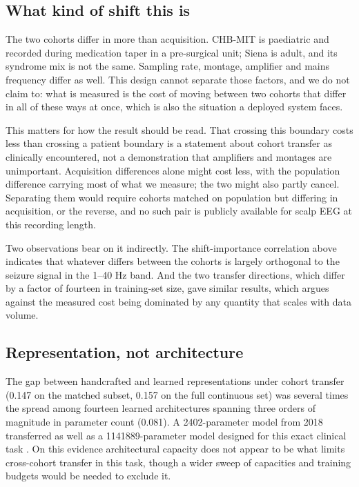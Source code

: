 \documentclass[11pt,a4paper]{article}
\begin{document}
\subsection{What kind of shift this is}\label{sec:whatshift}

The two cohorts differ in more than acquisition. CHB-MIT is paediatric and
recorded during medication taper in a pre-surgical unit; Siena is adult, and
its syndrome mix is not the same. Sampling rate, montage, amplifier and mains
frequency differ as well. This design cannot separate those factors, and we
do not claim to: what is measured is the cost of moving between two cohorts
that differ in all of these ways at once, which is also the situation a
deployed system faces.

This matters for how the result should be read. That crossing this boundary costs
less than crossing a patient boundary is a statement about cohort transfer
as clinically encountered, not a demonstration that amplifiers and montages
are unimportant. Acquisition differences alone might
cost less, with the population difference carrying most of what we measure;
the two might also partly cancel. Separating them would require cohorts
matched on population but differing in acquisition, or the reverse, and no
such pair is publicly available for scalp EEG at this recording length.

Two observations bear on it indirectly. The shift-importance correlation
above indicates that whatever differs between the cohorts is largely
orthogonal to the seizure signal in the 1--40 Hz band. And the two transfer
directions, which differ by a factor of fourteen in training-set size, gave
similar results, which argues against the measured cost being dominated by
any quantity that scales with data volume.

\subsection{Representation, not architecture}

The gap between handcrafted and learned representations under cohort transfer
(0.147 on the matched subset, 0.157 on the full continuous set) was several
times the spread among fourteen learned architectures spanning three orders
of magnitude in parameter count (0.081). A
\num{2402}-parameter model from 2018 \citep{lawhern2018} transferred as well
as a \num{1141889}-parameter model designed for this exact clinical task
\citep{jing2023}. On this evidence architectural capacity does not appear to
be what limits cross-cohort transfer in this task, though a wider sweep of
capacities and training budgets would be needed to exclude it.
\end{document}
